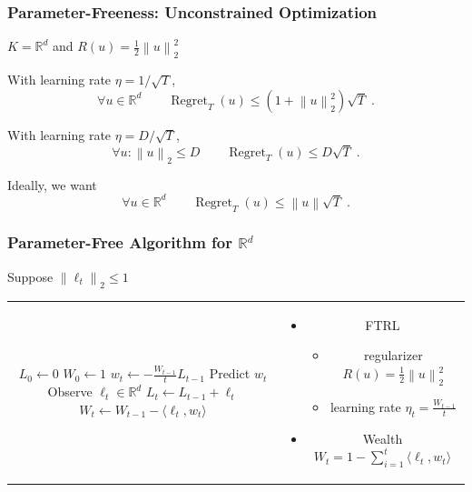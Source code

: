 \documentclass[usenames,dvipsnames]{beamer}
\DeclareMathOperator{\Regret}{Regret}
\newcommand{\R}{\mathbb{R}}
\newcommand{\norm}[1]{\left\|#1\right\|}
\begin{document}
\begin{frame}
\frametitle{Parameter-Freeness: Unconstrained Optimization}

$K=\R^d$ and $R(u) = \frac{1}{2} \norm{u}_2^2$

\pause
\vspace{0.5cm}

With learning rate $\eta = 1/\sqrt{T}$,
$$
\forall u \in \R^d  \qquad \Regret_T(u) \le \left(1 + \norm{u}_2^2 \right) \sqrt{T} \; .
$$

\pause
\vspace{0.5cm}

With learning rate $\eta = D/\sqrt{T}$,
$$
\forall u : \norm{u}_2 \le D \qquad  \Regret_T(u) \le D \sqrt{T} \; .
$$

\pause
\vspace{0.5cm}

Ideally, we want
$$
\forall u \in \R^d \qquad  \Regret_T(u) \le \norm{u} \sqrt{T} \; .
$$
\end{frame}

\begin{frame}
\frametitle{Parameter-Free Algorithm for $\R^d$}

\fontsize{10pt}{14}\selectfont

Suppose $\norm{\ell_t}_2 \le 1$

\vspace{1cm}

\begin{tabular}{c|c}
\begin{minipage}{4.3cm}
\begin{algorithmic}
{
\STATE $L_0 \leftarrow 0$
\STATE $W_0 \leftarrow 1$
\FOR{$t=1,2,3,\dots$}
\STATE $w_t \leftarrow - \frac{W_{t-1}}{t}  L_{t-1} $
\STATE Predict $w_t$
\STATE Observe $\ell_t \in \R^d$
\STATE $L_t \leftarrow L_{t-1} + \ell_t$
\STATE $W_t \leftarrow W_{t-1} - \langle \ell_t, w_t \rangle$
\ENDFOR
}
\end{algorithmic}
\end{minipage}
&
\pause
\begin{minipage}{5.7cm}
\begin{itemize}
\item FTRL
\begin{itemize}
\item regularizer $R(u) = \frac{1}{2}\norm{u}_2^2$
\item learning rate $\eta_t = \frac{W_{t-1}}{t}$
\end{itemize}
\item Wealth $W_t = 1 - \sum_{i=1}^t \langle \ell_t, w_t \rangle$
\end{itemize}
\end{minipage}
\end{tabular}

\end{frame}
\end{document}
